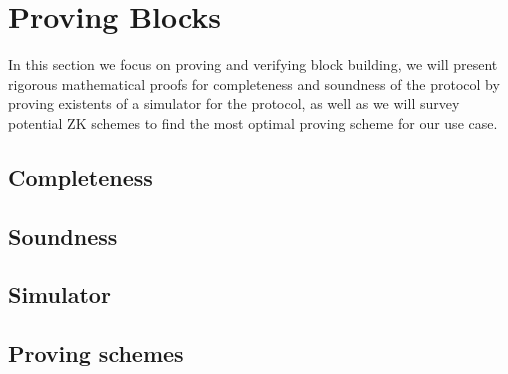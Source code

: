 \section{Proving Blocks}
\label{sec:proving_blocks}

In this section we focus on proving and verifying block building, we will present rigorous mathematical proofs for completeness and soundness of the protocol by proving existents of a simulator for the protocol, as well as we will survey potential ZK schemes to find the most optimal proving scheme for our use case.

\subsection{Completeness}
\subsection{Soundness}
\subsection{Simulator}
\subsection{Proving schemes}
